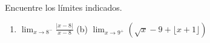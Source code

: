 \item Encuentre los límites indicados.
\begin{enumerate}
    \item[(a)] $\displaystyle \lim_{x \to 8^-} \frac{|x-8|}{x-8}$ \quad (b) $\displaystyle \lim_{x \to 9^+} (\sqrt{x}-9 + \lfloor x+1 \rfloor)$
\end{enumerate}
